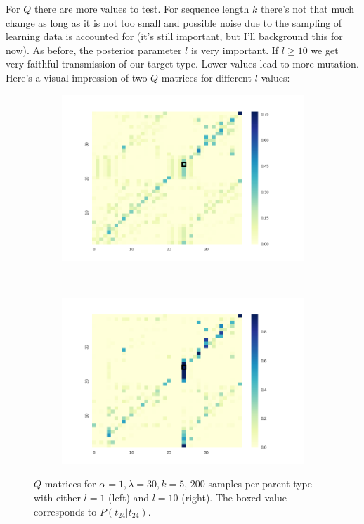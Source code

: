 \documentclass[a4paper]{article}
\begin{document}
For $Q$ there are more values to test. For sequence length $k$ there's not that much change as long as it is not too small and possible noise due to the sampling of learning data is accounted for (it's still important, but I'll background this for now). As before, the posterior parameter $l$ is very important. If $l \geq 10$ we get very faithful transmission of our target type. Lower values lead to more mutation. Here's a visual impression of two $Q$ matrices for different $l$ values:
\begin{figure}[h!]
  \centering
  \begin{subfigure}[b]{0.45\textwidth}
    \includegraphics[scale=0.4]{../code-LOT-extension/q-l30-a1-k5-l1.png}
  \end{subfigure}
  ~
   \begin{subfigure}[b]{0.45\textwidth}
    \includegraphics[scale=0.4]{../code-LOT-extension/q-l30-a1-k5-l10.png}
  \end{subfigure}
  \caption{$Q$-matrices for $\alpha = 1, \lambda = 30, k = 5$, $200$ samples per parent type with either $l = 1$ (left) and $l = 10$ (right). The boxed value corresponds to $P(t_{24} | t_{24})$.}
  \label{fig:q-matrices}
\end{figure}
\end{document}
